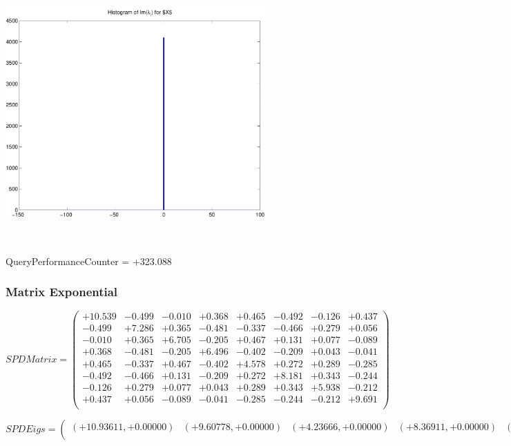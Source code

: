 \documentclass[9pt]{article}
\theoremstyle{plain}
\theoremstyle{definition}
\theoremstyle{remark}
\numberwithin{equation}{section}
\begin{document}
\includegraphics[width=10.0cm,height=10.0cm]{Im_lambda_n.pdf}

QueryPerformanceCounter  =  +323.088
\subsubsection{Matrix Exponential }
$SPD Matrix = \left(
\begin{array}{
cccccccc}
+10.539 & -0.499 & -0.010 & +0.368 & +0.465 & -0.492 & -0.126 & +0.437 \\
-0.499 & +7.286 & +0.365 & -0.481 & -0.337 & -0.466 & +0.279 & +0.056 \\
-0.010 & +0.365 & +6.705 & -0.205 & +0.467 & +0.131 & +0.077 & -0.089 \\
+0.368 & -0.481 & -0.205 & +6.496 & -0.402 & -0.209 & +0.043 & -0.041 \\
+0.465 & -0.337 & +0.467 & -0.402 & +4.578 & +0.272 & +0.289 & -0.285 \\
-0.492 & -0.466 & +0.131 & -0.209 & +0.272 & +8.181 & +0.343 & -0.244 \\
-0.126 & +0.279 & +0.077 & +0.043 & +0.289 & +0.343 & +5.938 & -0.212 \\
+0.437 & +0.056 & -0.089 & -0.041 & -0.285 & -0.244 & -0.212 & +9.691 \\
\end{array}
\right)$ \newline 

$SPD Eigs = \left(
\begin{array}{
cccccccc}
(+10.93611,+0.00000) & (+9.60778,+0.00000) & (+4.23666,+0.00000) & (+8.36911,+0.00000) & (+7.56229,+0.00000) & (+5.82791,+0.00000) & (+6.54198,+0.00000) & (+6.33139,+0.00000) \\
\end{array}
\right)$ \newline 
\end{document}
